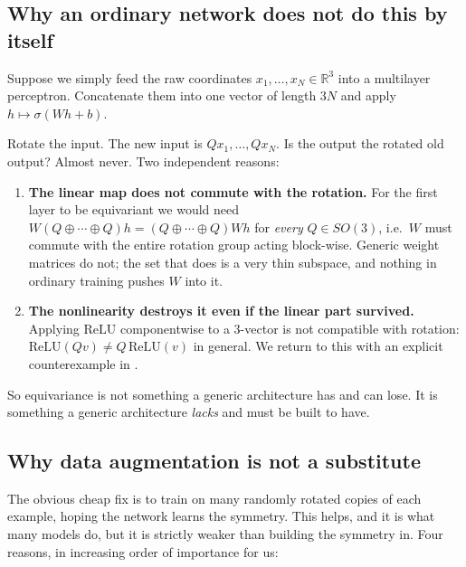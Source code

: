 \documentclass[11pt,a4paper]{report}
\theoremstyle{definition}
\theoremstyle{remark}
\newcommand{\RR}{\mathbb R}
\begin{document}
\subsection{Why an ordinary network does not do this by itself}

Suppose we simply feed the raw coordinates $x_1,\dots,x_N\in\RR^3$ into a
multilayer perceptron. Concatenate them into one vector of length $3N$ and
apply $h\mapsto \sigma(Wh+b)$.

Rotate the input. The new input is $Qx_1,\dots,Qx_N$. Is the output the
rotated old output? Almost never. Two independent reasons:

\begin{enumerate}
\item \textbf{The linear map does not commute with the rotation.} For the
first layer to be equivariant we would need $W(Q\oplus\cdots\oplus Q)h
= (Q\oplus\cdots\oplus Q)Wh$ for \emph{every} $Q\in SO(3)$, i.e.\ $W$ must
commute with the entire rotation group acting block-wise. Generic weight
matrices do not; the set that does is a very thin subspace, and nothing in
ordinary training pushes $W$ into it.
\item \textbf{The nonlinearity destroys it even if the linear part
survived.} Applying $\mathrm{ReLU}$ componentwise to a $3$-vector is not
compatible with rotation: $\mathrm{ReLU}(Qv)\ne Q\,\mathrm{ReLU}(v)$ in
general. We return to this with an explicit counterexample in
.
\end{enumerate}

So equivariance is not something a generic architecture has and can lose.
It is something a generic architecture \emph{lacks} and must be built to
have.

\subsection{Why data augmentation is not a substitute}
\label{sec:no-augmentation}

The obvious cheap fix is to train on many randomly rotated copies of each
example, hoping the network learns the symmetry. This helps, and it is what
many models do, but it is strictly weaker than building the symmetry in.
Four reasons, in increasing order of importance for us:
\end{document}
